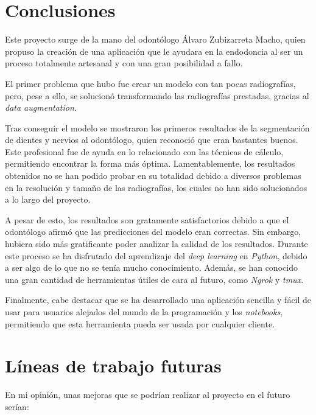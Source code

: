 
\section{Conclusiones}
Este proyecto surge de la mano del odontólogo Álvaro Zubizarreta Macho, quien propuso la creación de una aplicación que le ayudara en la endodoncia al ser un proceso totalmente artesanal y con una gran posibilidad a fallo.

El primer problema que hubo fue crear un modelo con tan pocas radiografías, pero, pese a ello, se solucionó transformando las radiografías prestadas, gracias al \emph{data augmentation}.

Tras conseguir el modelo se mostraron los primeros resultados de la segmentación de dientes y nervios al odontólogo, quien reconoció que eran bastantes buenos. Este profesional fue de ayuda en lo relacionado con las técnicas de cálculo, permitiendo encontrar la forma más óptima. Lamentablemente, los resultados obtenidos no se han podido probar en su totalidad debido a diversos problemas en la resolución y tamaño de las radiografías, los cuales no han sido solucionados a lo largo del proyecto.

A pesar de esto, los resultados son gratamente satisfactorios debido a que el odontólogo afirmó que las predicciones del modelo eran correctas. Sin embargo, hubiera sido más gratificante poder analizar la calidad de los resultados.
Durante este proceso se ha disfrutado del aprendizaje del \emph{deep learning} en \emph{Python}, debido a ser algo de lo que no se tenía mucho conocimiento. Además, se han conocido una gran cantidad de herramientas útiles de cara al futuro, como \emph{Ngrok} y \emph{tmux}.

Finalmente, cabe destacar que se ha desarrollado una aplicación sencilla y fácil de usar para usuarios alejados del mundo de la programación y los \emph{notebooks}, permitiendo que esta herramienta pueda ser usada por cualquier cliente.

\section{Líneas de trabajo futuras}
En mi opinión, unas mejoras que se podrían realizar al proyecto en el futuro serían:

